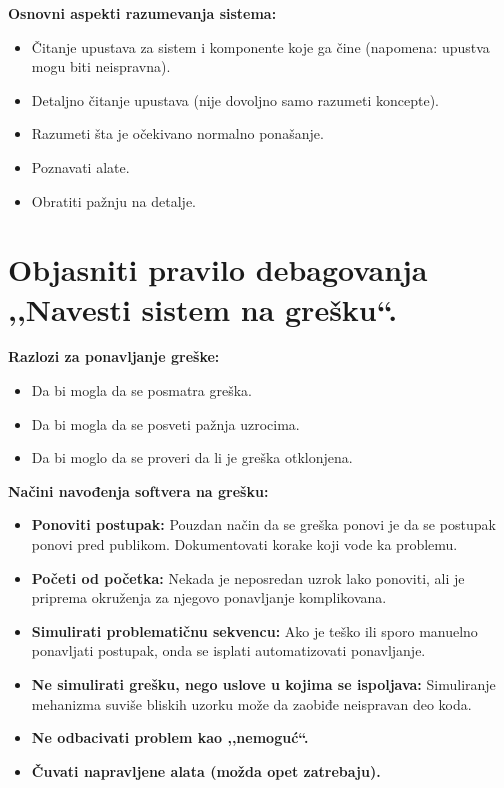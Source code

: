 \documentclass[a4paper]{article}
\begin{document}
  \textbf{Osnovni aspekti razumevanja sistema:}
  \begin{itemize}
    \item Čitanje upustava za sistem i komponente koje ga čine (napomena: upustva mogu
          biti neispravna).
    \item Detaljno čitanje upustava (nije dovoljno samo razumeti koncepte).
    \item Razumeti šta je očekivano normalno ponašanje.
    \item Poznavati alate.
    \item Obratiti pažnju na detalje.
  \end{itemize}

\section{Objasniti pravilo debagovanja ,,Navesti sistem na grešku``.}
  \noindent \textbf{Razlozi za ponavljanje greške:}
  \begin{itemize}
    \item Da bi mogla da se posmatra greška.
    \item Da bi mogla da se posveti pažnja uzrocima.
    \item Da bi moglo da se proveri da li je greška otklonjena.\\
  \end{itemize}

  \textbf{Načini navođenja softvera na grešku:}
  \begin{itemize}
    \item \textbf{Ponoviti postupak:} Pouzdan način da se greška ponovi je da se postupak ponovi pred
          publikom. Dokumentovati korake koji vode ka problemu.
    \item \textbf{Početi od početka:} Nekada je neposredan uzrok lako ponoviti, ali je priprema 
          okruženja za njegovo ponavljanje komplikovana.
    \item \textbf{Simulirati problematičnu sekvencu:} Ako je teško ili sporo manuelno ponavljati postupak, onda
          se isplati automatizovati ponavljanje.
    \item \textbf{Ne simulirati grešku, nego uslove u kojima se ispoljava:} Simuliranje mehanizma 
          suviše bliskih uzorku može da zaobiđe neispravan deo koda.
    \item \textbf{Ne odbacivati problem kao ,,nemoguć``.}
    \item \textbf{Čuvati napravljene alata (možda opet zatrebaju).}\\
  \end{itemize}
\end{document}
